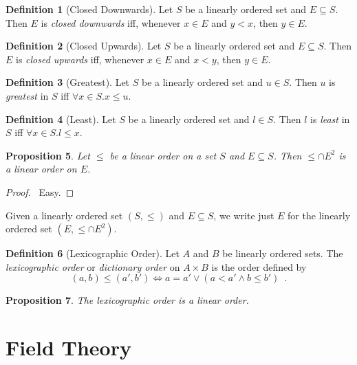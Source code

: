 \documentclass{book}
\let\qed\relax
\newtheorem{prop}{Proposition}[chapter]
\theoremstyle{definition}
\newtheorem{df}[prop]{Definition}
\begin{document}
\begin{df}[Closed Downwards]
Let $S$ be a linearly ordered set and $E \subseteq S$. Then $E$ is \emph{closed downwards} iff, whenever $x \in E$ and $y < x$, then $y \in E$.
\end{df}

\begin{df}[Closed Upwards]
Let $S$ be a linearly ordered set and $E \subseteq S$. Then $E$ is \emph{closed upwards} iff, whenever $x \in E$ and $x < y$, then $y \in E$.
\end{df}

\begin{df}[Greatest]
Let $S$ be a linearly ordered set and $u \in S$. Then $u$ is \emph{greatest} in $S$ iff $\forall x \in S. x \leq u$.
\end{df}

\begin{df}[Least]
Let $S$ be a linearly ordered set and $l \in S$. Then $l$ is \emph{least} in $S$ iff $\forall x \in S. l \leq x$.
\end{df}

\begin{prop}
Let $\leq$ be a linear order on a set $S$ and $E \subseteq S$. Then $\leq \cap E^2$ is a linear order on $E$.
\end{prop}

\begin{proof}
\pf\ Easy. \qed
\end{proof}

Given a linearly ordered set $(S, \leq)$ and $E \subseteq S$, we write just $E$ for the linearly ordered set $(E, \leq \cap E^2)$.

\begin{df}[Lexicographic Order]
Let $A$ and $B$ be linearly ordered sets. The \emph{lexicographic order} or \emph{dictionary order} on $A \times B$ is the order defined by
\[ (a,b) \leq (a',b') \Leftrightarrow a = a' \vee (a < a' \wedge b \leq b') \enspace . \]
\end{df}

\begin{prop}
The lexicographic order is a linear order.
\end{prop}


\chapter{Field Theory}
\end{document}
